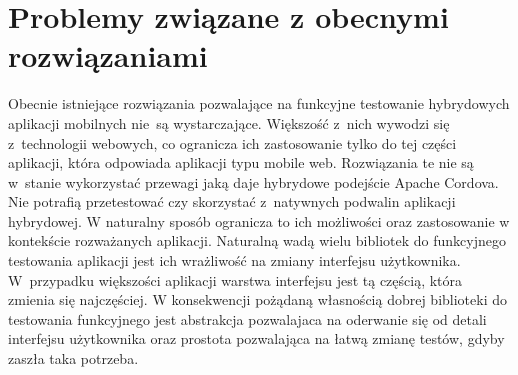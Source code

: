 \documentclass[brudnopis]{xmgr}
\begin{document}
\section{Problemy związane z obecnymi rozwiązaniami}

Obecnie istniejące rozwiązania pozwalające na funkcyjne testowanie hybrydowych aplikacji mobilnych nie~są wystarczające. Większość z~nich wywodzi się z~technologii webowych, co ogranicza ich zastosowanie tylko do tej części aplikacji, która odpowiada aplikacji typu mobile web. Rozwiązania te nie są w~stanie wykorzystać przewagi jaką daje hybrydowe podejście Apache Cordova. Nie potrafią przetestować czy skorzystać z~natywnych podwalin aplikacji hybrydowej. W naturalny sposób ogranicza to ich możliwości oraz zastosowanie w kontekście rozważanych aplikacji. Naturalną wadą wielu bibliotek do funkcyjnego testowania aplikacji jest ich wrażliwość na zmiany interfejsu użytkownika. W~przypadku większości aplikacji warstwa interfejsu jest tą częścią, która zmienia się najczęściej. W konsekwencji pożądaną własnością dobrej biblioteki do testowania funkcyjnego jest abstrakcja pozwalajaca na oderwanie się od detali interfejsu użytkownika oraz prostota pozwalająca na łatwą zmianę testów, gdyby zaszła taka potrzeba. 
\end{document}
